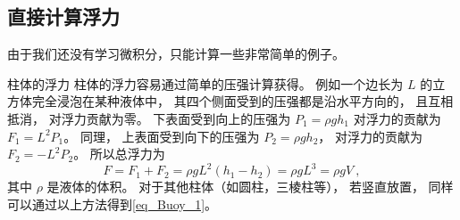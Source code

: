 
\subsection{直接计算浮力}

由于我们还没有学习微积分，只能计算一些非常简单的例子。
\begin{example}{柱体的浮力}
柱体的浮力容易通过简单的压强计算获得。 例如一个边长为 $L$ 的立方体完全浸泡在某种液体中， 其四个侧面受到的压强都是沿水平方向的， 且互相抵消， 对浮力贡献为零。 下表面受到向上的压强为 $P_1 = \rho g h_1$ 对浮力的贡献为 $F_1 = L^2 P_1$。 同理， 上表面受到向下的压强为 $P_2 = \rho g h_2$， 对浮力的贡献为 $F_2 = -L^2 P_2$。 所以总浮力为
\begin{equation}
F = F_1 + F_2 = \rho g L^2 (h_1 - h_2) = \rho g L^3 = \rho g V~,
\end{equation}
其中 $\rho$ 是液体的体积。 对于其他柱体（如圆柱，三棱柱等）， 若竖直放置， 同样可以通过以上方法得到\autoref{eq_Buoy_1}。
\end{example}

